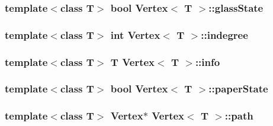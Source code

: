 \subsubsection[{\texorpdfstring{glass\+State}{glassState}}]{\setlength{\rightskip}{0pt plus 5cm}template$<$class T$>$ bool {\bf Vertex}$<$ T $>$\+::glass\+State\hspace{0.3cm}{\ttfamily [private]}}\hypertarget{classVertex_ab35cb5fe44be9ef7385a2714a4b45e11}{}\label{classVertex_ab35cb5fe44be9ef7385a2714a4b45e11}
\subsubsection[{\texorpdfstring{indegree}{indegree}}]{\setlength{\rightskip}{0pt plus 5cm}template$<$class T$>$ int {\bf Vertex}$<$ T $>$\+::indegree\hspace{0.3cm}{\ttfamily [private]}}\hypertarget{classVertex_ab29ac1b694fc673ba26cfc6d3e9bda13}{}\label{classVertex_ab29ac1b694fc673ba26cfc6d3e9bda13}
\subsubsection[{\texorpdfstring{info}{info}}]{\setlength{\rightskip}{0pt plus 5cm}template$<$class T$>$ T {\bf Vertex}$<$ T $>$\+::info\hspace{0.3cm}{\ttfamily [private]}}\hypertarget{classVertex_a415d7811eef6cdd992f0dca1f35a49cd}{}\label{classVertex_a415d7811eef6cdd992f0dca1f35a49cd}
\subsubsection[{\texorpdfstring{paper\+State}{paperState}}]{\setlength{\rightskip}{0pt plus 5cm}template$<$class T$>$ bool {\bf Vertex}$<$ T $>$\+::paper\+State\hspace{0.3cm}{\ttfamily [private]}}\hypertarget{classVertex_a4e60ef51bac5518a768c94cbe5e3a3a1}{}\label{classVertex_a4e60ef51bac5518a768c94cbe5e3a3a1}
\subsubsection[{\texorpdfstring{path}{path}}]{\setlength{\rightskip}{0pt plus 5cm}template$<$class T$>$ {\bf Vertex}$\ast$ {\bf Vertex}$<$ T $>$\+::path}\hypertarget{classVertex_abd40febd917aa25add6bd42237c8463a}{}\label{classVertex_abd40febd917aa25add6bd42237c8463a}
